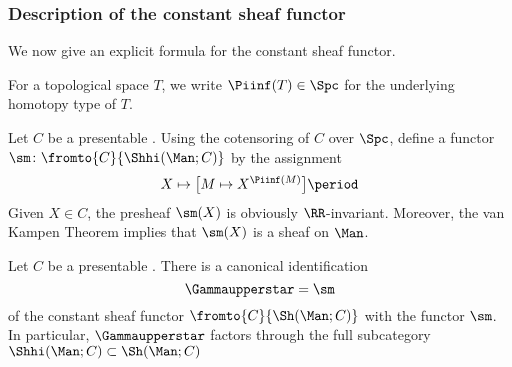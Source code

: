 \subsubsection{Description of the constant sheaf functor}

We now give an explicit formula for the constant sheaf functor.

\begin{notation}
	For a topological space $ T $, we write $ \Piinf(T) \in \Spc $ for the underlying homotopy type of $ T $.
\end{notation}

\begin{construction}
	Let $ C $ be a presentable \category.
	Using the cotensoring of $ C $ over $ \Spc $, define a functor $ \sm \colon \fromto{C}{\Shhi(\Man;C)} $ by the assignment
	\begin{equation*}
		X \mapsto \big[M \mapsto X^{\Piinf(M)}\big] \period 
	\end{equation*}
	Given $ X \in C $, the presheaf $ \sm(X) $ is obviously $ \RR $-invariant. 
	Moreover, the van Kampen Theorem  implies that $ \sm(X) $ is a sheaf on $ \Man $.

\end{construction}

\begin{proposition}\label{lem:constantishi}
	Let $ C $ be a presentable \category.
	There is a canonical identification
	\begin{equation*}
		\Gammaupperstar = \sm
	\end{equation*}
	of the constant sheaf functor $ \fromto{C}{\Sh(\Man;C)} $ with the functor $ \sm $.
	In particular, $ \Gammaupperstar $ factors through the full subcategory $ \Shhi(\Man;C) \subset \Sh(\Man;C) $
\end{proposition}

